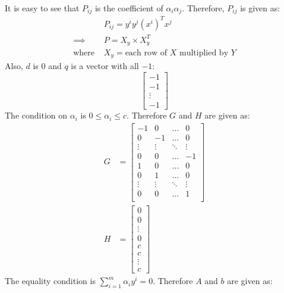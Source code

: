 \documentclass[11pt]{article}
\begin{document}
It is easy to see that $P_{ij}$ is the coefficient of $\alpha_i \alpha_j$. Therefore, $P_{ij}$ is given as:
\begin{equation}
  \begin{split}
    &P_{ij} = y^i y^j (x^i)^T x^j\\
    \implies &P = X_y\times X_y^T\\
    \text{where }&X_y = \text{each row of }X\text{ multiplied by }Y
  \end{split}
\end{equation}
Also, $d$ is $0$ and $q$ is a vector with all $-1$:
\begin{equation}
  \begin{bmatrix}
    -1\\
    -1\\
    \vdots\\
    -1
  \end{bmatrix}
\end{equation}
The condition on $\alpha_i$ is $0 \leq \alpha_i \leq c$. Therefore $G$ and $H$ are given as:
\begin{equation}
  \begin{split}
    G &=
    \begin{bmatrix}
      -1 & 0 & \ldots & 0\\
      0 & -1 & \ldots & 0\\
      \vdots & \vdots & \ddots & \vdots\\
      0 & 0 & \ldots & -1\\
      1 & 0 & \ldots & 0\\
      0 & 1 & \ldots & 0\\
      \vdots & \vdots & \ddots & \vdots\\
      0 & 0 & \ldots & 1\\
    \end{bmatrix}\\
    H &=
    \begin{bmatrix}
      0\\
      0\\
      \vdots\\
      0\\
      c\\
      c\\
      \vdots\\
      c
    \end{bmatrix}
  \end{split}
\end{equation}
The equality condition is $\sum_{i=1}^m \alpha_i y^i = 0$. Therefore $A$ and $b$ are given as:
\end{document}
